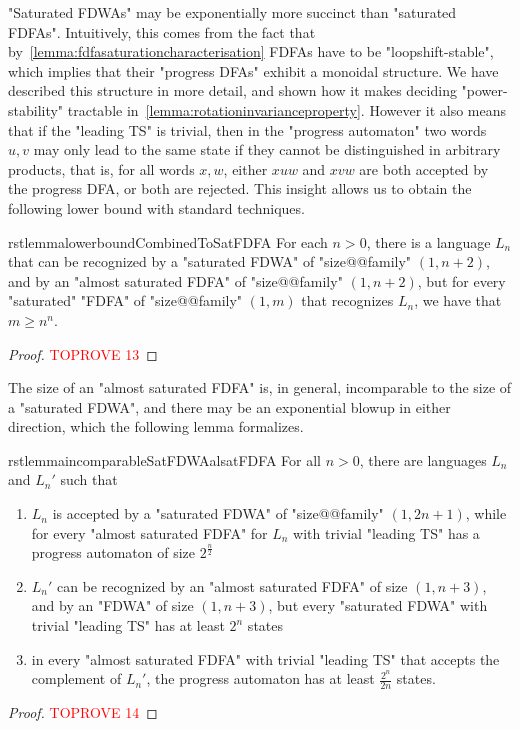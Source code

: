 \documentclass[a4paper,USenglish,cleveref,autoref,thm-restate]{lipics-v2021}
\begin{document}
"Saturated FDWAs" may be exponentially more succinct than "saturated FDFAs".
Intuitively, this comes from the fact that by~\cref{lemma:fdfasaturationcharacterisation} FDFAs have to be "loopshift-stable", which implies that their "progress DFAs" exhibit a monoidal structure.
We have described this structure in more detail, and shown how it makes deciding "power-stability" tractable in~\cref{lemma:rotationinvarianceproperty}.
However it also means that if the "leading TS" is trivial, then in the "progress automaton" two words $u,v$ may only lead to the same state if they cannot be distinguished in arbitrary products, that is, for all words $x,w$, either $xuw$ and $xvw$ are both accepted by the progress DFA, or both are rejected.
This insight allows us to obtain the following lower bound with standard techniques.

\begin{restatable}{rstlemma}{lowerboundCombinedToSatFDFA}
    For each $n > 0$, there is a language $L_n$ that can be recognized by a "saturated FDWA" of "size@@family" $(1,n+2)$, and by an "almost saturated FDFA" of "size@@family" $(1,n+2)$, but for every "saturated" "FDFA" of "size@@family" $(1,m)$ that recognizes $L_n$, we have that $m \geq n^n$.
  \label{lemma:lowerbound:combinedToSatFDFA}
\end{restatable}
\begin{proof}\textcolor{red}{TOPROVE 13}\end{proof}

The size of an "almost saturated FDFA" is, in general, incomparable to the size of a "saturated FDWA", and there may be an exponential blowup in either direction, which the following lemma formalizes.

\begin{restatable}{rstlemma}{incomparableSatFDWAalsatFDFA}
  \label{lemma:incomparableSatFDWAalsatFDFA} 
  For all $n > 0$, there are languages $L_n$ and $L_n'$
such that
  \begin{enumerate}
      \item\label{satFDWAsmall:alsatFDFAbig}
      $L_n$ is accepted by a "saturated FDWA" of "size@@family" $(1,2n+1)$, while for every "almost saturated FDFA" for $L_n$ with trivial "leading TS" has a progress automaton of size $2^{\frac{n}{2}}$
      \item\label{alsatFDFAsmall:FDWAsmall:satFDWAbig}
      $L_n'$ can be recognized by an "almost saturated FDFA" of size $(1,n+3)$, and by an "FDWA" of size $(1,n+3)$, but every "saturated FDWA" with trivial "leading TS" has at least $2^n$ states
      \item\label{alsatFDFAcomplementbig}
      in every "almost saturated FDFA" with trivial "leading TS" that accepts the complement of $L_n'$, the progress automaton has at least $\frac{2^n}{2n}$ states.
  \end{enumerate}
\end{restatable}
\begin{proof}\textcolor{red}{TOPROVE 14}\end{proof}
\end{document}
